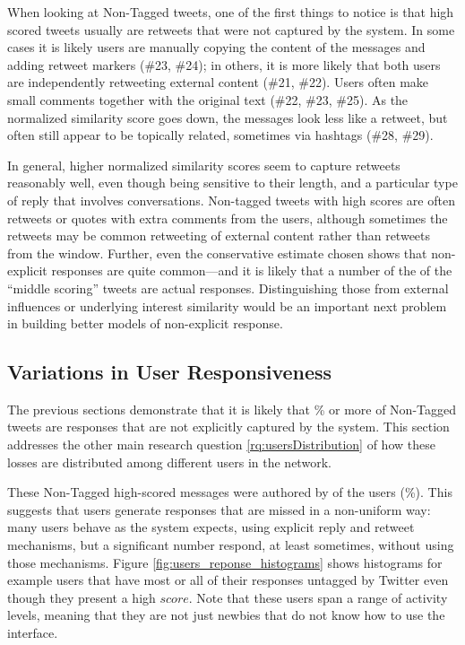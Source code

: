 When looking at Non-Tagged tweets, one of the first things to notice is that high scored tweets usually are retweets that were not captured by the system.  In some cases it is likely users are manually copying the content of the messages and adding retweet markers (\#23, \#24); in others, it is more likely that both users are independently retweeting external content (\#21, \#22).  Users often make small comments together with the original text (\#22, \#23, \#25).  As the normalized similarity score goes down, the messages look less like a retweet, but often still appear to be topically related, sometimes via hashtags (\#28, \#29).  

In general, higher normalized similarity scores seem to capture retweets reasonably well, even though being sensitive to their length, and a particular type of reply that involves conversations.  Non-tagged tweets with high scores are often retweets or quotes with extra comments from the users, although sometimes the retweets may be common retweeting of external content rather than retweets from the window.
Further, even the conservative estimate chosen shows that non-explicit responses are quite common---and it is likely that a number of the of the ``middle scoring'' tweets are actual responses.  Distinguishing those from external influences or underlying interest similarity would be an important next problem in building better models of non-explicit response.  

\subsection{Variations in User Responsiveness}

The previous sections demonstrate that it is likely that \highNonTaggedTweetCountPct{}\% or more of Non-Tagged tweets are responses that are not explicitly captured by the system.  This section addresses the other main research question \ref{rq:usersDistribution} of how these losses are distributed among different users in the network.   

These Non-Tagged high-scored messages were authored by \highUserCount{} of the \totalUsers{} users (\highUserCountPct{}\%). This suggests that users generate responses that are missed in a non-uniform way: many users behave as the system expects, using explicit reply and retweet mechanisms, but a significant number respond, at least sometimes, without using those mechanisms. 
Figure \ref{fig:users_reponse_histograms} shows histograms for example users that have most or all of their responses untagged by Twitter even though they present a high $score$.  Note that these users span a range of activity levels, meaning that they are not just newbies that do not know how to use the interface.

